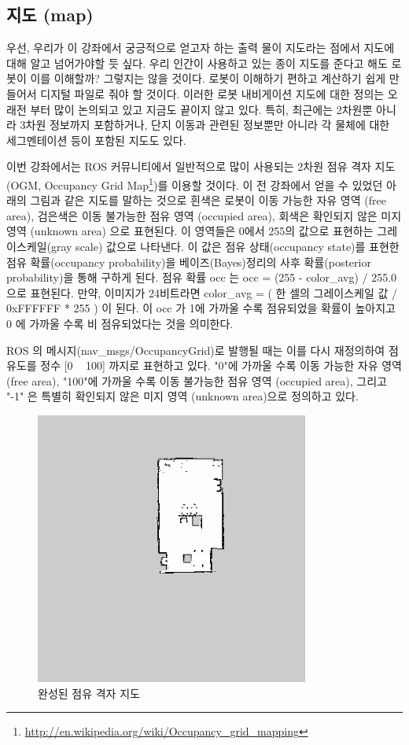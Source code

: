 \subsection{지도 (map)}

우선, 우리가 이 강좌에서 궁긍적으로 얻고자 하는 출력 물이 지도라는 점에서 지도에 대해 알고 넘어가야할 듯 싶다. 우리 인간이 사용하고 있는 종이 지도를 준다고 해도 로봇이 이를 이해할까? 그렇지는 않을 것이다. 로봇이 이해하기 편하고 계산하기 쉽게 만들어서 디지털 파일로 줘야 할 것이다. 이러한 로봇 내비게이션 지도에 대한 정의는 오래전 부터 많이 논의되고 있고 지금도 끝이지 않고 있다. 특히, 최근에는 2차원뿐 아니라 3차원 정보까지 포함하거나, 단지 이동과 관련된 정보뿐만 아니라 각 물체에 대한 세그멘테이션 등이 포함된 지도도 있다.

이번 강좌에서는 ROS 커뮤니티에서 일반적으로 많이 사용되는 2차원 점유 격자 지도(OGM, Occupancy Grid Map\footnote{\url{http://en.wikipedia.org/wiki/Occupancy_grid_mapping}})를 이용할 것이다. 이 전 강좌에서 얻을 수 있었던 아래의 그림과 같은 지도를 말하는 것으로 흰색은 로봇이 이동 가능한 자유 영역 (free area), 검은색은 이동 불가능한 점유 영역 (occupied area), 회색은 확인되지 않은 미지 영역 (unknown area) 으로 표현된다. 이 영역들은 0에서 255의 값으로 표현하는 그레이스케일(gray scale) 값으로 나타낸다. 이 값은 점유 상태(occupancy state)를 표현한 점유 확률(occupancy probability)을 베이즈(Bayes)정리의 사후 확률(posterior probability)을 통해 구하게 된다. 점유 확률 occ 는 occ = (255 - color\_avg) / 255.0 으로 표현된다. 만약, 이미지가 24비트라면 color\_avg = ( 한 셀의 그레이스케일 값 / 0xFFFFFF * 255 ) 이 된다. 이 occ 가 1에 가까울 수록 점유되었을 확률이 높아지고 0 에 가까울 수록 비 점유되었다는 것을 의미한다.

ROS 의 메시지(nav\_msgs/OccupancyGrid)로 발행될 때는 이를 다시 재정의하여 점유도를 정수 [0 ~ 100] 까지로 표현하고 있다. "0"에 가까울 수록 이동 가능한 자유 영역 (free area), "100"에 가까울 수록 이동 불가능한 점유 영역 (occupied area), 그리고 "-1" 은 특별히 확인되지 않은 미지 영역 (unknown area)으로 정의하고 있다.

\begin{figure}[h]
\centering
\includegraphics[width=0.7\columnwidth]{pictures/chapter11/slam_map.png}
\caption{완성된 점유 격자 지도}
\end{figure}


